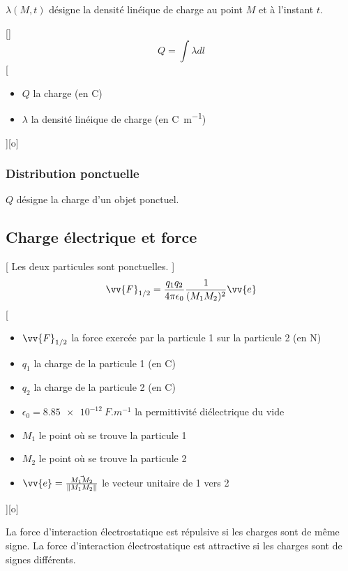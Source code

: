 $\lambda(M,t)$ désigne la densité linéique de charge au point $M$ et à l'instant $t$.

[]
{$$Q=\int\lambda dl$$}
[
    \begin{itemize}
        \item $Q$ la charge (en \unit{C})
        \item $\lambda$ la densité linéique de charge (en \unit{C.m^{-1}})
    \end{itemize}
][o]

\subsubsection{Distribution ponctuelle}

$Q$ désigne la charge d'un objet ponctuel.

\subsection{Charge électrique et force}

[
    Les deux particules sont ponctuelles.
]
{$$\vv{F}_{1/2} = \frac{q_1q_2}{4\pi\epsilon_0}\frac{1}{(M_1M_2)^2}\vv{e}$$
\schema{}{3cm}}
[
    \begin{itemize}
        \item $\vv{F}_{1/2}$ la force exercée par la particule 1 sur la particule 2 (en \unit{N})
        \item $q_1$ la charge de la particule 1 (en \unit{C})
        \item $q_2$ la charge de la particule 2 (en \unit{C})
        \item $\epsilon_0=\SI{8.85e-12}{F.m^{-1}}$ la permittivité diélectrique du vide
        \item $M_1$ le point où se trouve la particule 1
        \item $M_2$ le point où se trouve la particule 2
        \item $\vv{e}=\frac{\vec{M_1M_2}}{\|M_1M_2\|}$ le vecteur unitaire de 1 vers 2
    \end{itemize}
][o]


La force d'interaction électrostatique est répulsive si les charges sont de même signe.
La force d'interaction électrostatique est attractive si les charges sont de signes différents.

